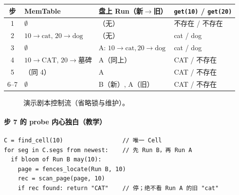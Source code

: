 \begin{center}
\small
\begin{tabular}{@{}clp{3.4cm}p{3.6cm}@{}}
\toprule
步 & MemTable & 盘上 Run（新$\to$旧） & \texttt{get(10)} / \texttt{get(20)} \\
\midrule
1 & $\emptyset$ & （无） & 不存在 / 不存在 \\
2 & $10\to\mathrm{cat},\,20\to\mathrm{dog}$ & （无） & cat / dog \\
3 & $\emptyset$ & A: $10\to\mathrm{cat},20\to\mathrm{dog}$ & cat / dog \\
4 & $10\to\mathrm{CAT},\,20\to$墓碑 & A（同上） & CAT / 不存在 \\
5 & （同 4） & A & CAT / 不存在 \\
6--7 & $\emptyset$ & B（新）, A（旧） & CAT / 不存在 \\
\bottomrule
\end{tabular}
\end{center}

\begin{figure}[H]
\centering
{}
\caption{演示剧本控制流（省略锁与维护）。}
\end{figure}

\paragraph{步 7 的 probe 内心独白（教学）}
\begin{lstlisting}[language=pseudo,caption={get(10) 在步 7：Mem 已空}]
C = find_cell(10)                 // 唯一 Cell
for seg in C.segs from newest:    // 先 Run B，再 Run A
  if bloom of Run B may(10):
    page = fences_locate(Run B, 10)
    rec = scan_page(page, 10)
    if rec found: return "CAT"    // 停；绝不看 Run A 的旧 "cat"
\end{lstlisting}

